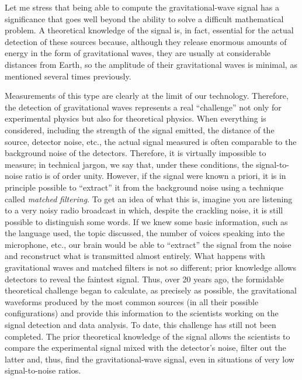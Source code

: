 Let me stress that being able to compute the gravitational-wave signal has a
significance that goes well beyond the ability to solve a difficult mathematical
problem. A theoretical knowledge of the signal is, in fact, essential for the actual
detection of these sources because, although they release enormous amounts of energy in
the form of gravitational waves, they are usually at considerable distances from Earth,
so the amplitude of their gravitational waves is minimal, as mentioned several times
previously.

Measurements of this type are clearly at the limit of our technology. Therefore, the
detection of gravitational waves represents a real ``challenge'' not only for
experimental physics but also for theoretical physics. When everything is considered,
including the strength of the signal emitted, the distance of the source, detector
noise, etc., the actual signal measured is often comparable to the background noise of
the detectors. Therefore, it is virtually impossible to measure; in technical jargon, we
say that, under these conditions, the
signal-to-noise ratio is of order unity. However,
if the signal were known a priori, it is in principle possible to ``extract'' it from
the background noise using a technique called \emph{matched}
\emph{filtering}. To get an idea of what this is, imagine you are listening to a very
noisy radio broadcast in which, despite the crackling noise, it is still possible to
distinguish some words. If we knew some basic information, such as the language used,
the topic discussed, the number of voices speaking into the microphone, etc., our brain
would be able to ``extract'' the signal from the noise and reconstruct what is
transmitted almost entirely. What happens with gravitational waves and matched
filters is not so different; prior knowledge allows detectors to
reveal the faintest signal. Thus, over 20 years ago, the formidable theoretical
challenge began to calculate, as precisely as possible, the gravitational waveforms
produced by the most common sources (in all their possible configurations) and provide
this information to the scientists working on the signal detection and data analysis. To
date, this challenge has still not been completed. The prior theoretical knowledge of
the signal allows the scientists to compare the experimental signal mixed with the
detector's noise, filter out the latter and, thus, find the gravitational-wave signal,
even in situations of very low signal-to-noise
ratios.

